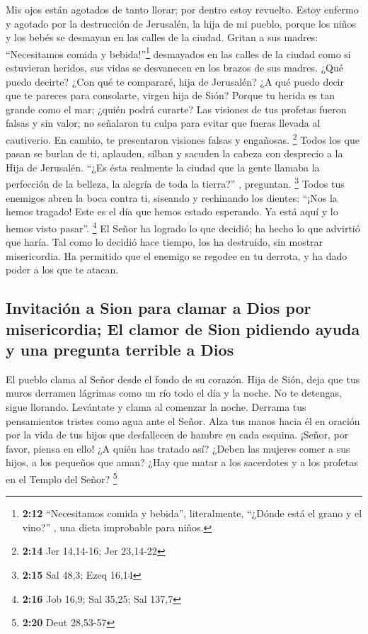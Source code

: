  Mis ojos están agotados de tanto llorar; por dentro
estoy revuelto. Estoy enfermo y agotado por la destrucción de Jerusalén,
la hija de mi pueblo, porque los niños y los bebés se desmayan en las
calles de la ciudad.  Gritan a sus madres: ``Necesitamos
comida y bebida!''\footnote{\textbf{2:12} ``Necesitamos comida y
  bebida'', literalmente, ``¿Dónde está el grano y el vino?'' , una
  dieta improbable para niños.} desmayados en las calles de la ciudad
como si estuvieran heridos, sus vidas se desvanecen en los brazos de sus
madres.  ¿Qué puedo decirte? ¿Con qué te compararé, hija
de Jerusalén? ¿A qué puedo decir que te pareces para consolarte, virgen
hija de Sión? Porque tu herida es tan grande como el mar; ¿quién podrá
curarte?  Las visiones de tus profetas fueron falsas y
sin valor; no señalaron tu culpa para evitar que fueras llevada al
cautiverio. En cambio, te presentaron visiones falsas y engañosas.
\footnote{\textbf{2:14} Jer 14,14-16; Jer 23,14-22} 
Todos los que pasan se burlan de ti, aplauden, silban y sacuden la
cabeza con desprecio a la Hija de Jerusalén. ``¿Es ésta realmente la
ciudad que la gente llamaba la perfección de la belleza, la alegría de
toda la tierra?'' , preguntan. \footnote{\textbf{2:15} Sal 48,3; Ezeq
  16,14}  Todos tus enemigos abren la boca contra ti,
siseando y rechinando los dientes: ``¡Nos la hemos tragado! Este es el
día que hemos estado esperando. Ya está aquí y lo hemos visto pasar''.
\footnote{\textbf{2:16} Job 16,9; Sal 35,25; Sal 137,7} 
El Señor ha logrado lo que decidió; ha hecho lo que advirtió que haría.
Tal como lo decidió hace tiempo, los ha destruido, sin mostrar
misericordia. Ha permitido que el enemigo se regodee en tu derrota, y ha
dado poder a los que te atacan.

\hypertarget{invitaciuxf3n-a-sion-para-clamar-a-dios-por-misericordia-el-clamor-de-sion-pidiendo-ayuda-y-una-pregunta-terrible-a-dios}{%
\subsection{Invitación a Sion para clamar a Dios por misericordia; El
clamor de Sion pidiendo ayuda y una pregunta terrible a
Dios}\label{invitaciuxf3n-a-sion-para-clamar-a-dios-por-misericordia-el-clamor-de-sion-pidiendo-ayuda-y-una-pregunta-terrible-a-dios}}

 El pueblo clama al Señor desde el fondo de su corazón.
Hija de Sión, deja que tus muros derramen lágrimas como un río todo el
día y la noche. No te detengas, sigue llorando. 
Levántate y clama al comenzar la noche. Derrama tus pensamientos tristes
como agua ante el Señor. Alza tus manos hacia él en oración por la vida
de tus hijos que desfallecen de hambre en cada esquina. 
¡Señor, por favor, piensa en ello! ¿A quién has tratado así? ¿Deben las
mujeres comer a sus hijos, a los pequeños que aman? ¿Hay que matar a los
sacerdotes y a los profetas en el Templo del Señor? \footnote{\textbf{2:20}
  Deut 28,53-57}

